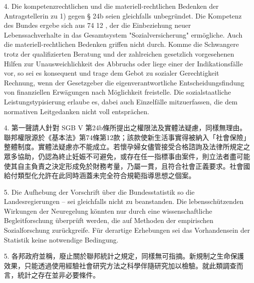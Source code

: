 \documentclass[12pt]{article}
\begin{document}
\begin{sourcepara}[title={原文C.29}]
4. Die kompetenzrechtlichen und die materiell-rechtlichen Bedenken der Antragstellerin zu 1) gegen § 24b \abbrSGBV{} seien gleichfalls unbegründet. Die Kompetenz des Bundes ergebe sich aus \abbrArt{} 74 \abbrNr{} 12 \abbrGG{}\ggfnArtSeventyFourTwelveDE{}, der die Einbeziehung neuer Lebenssachverhalte in das Gesamtsystem "Sozialversicherung" ermögliche. Auch die materiell-rechtlichen Bedenken griffen nicht durch. Komme die Schwangere trotz der qualifizierten Beratung und der zahlreichen gesetzlich vorgesehenen Hilfen zur Unausweichlichkeit des Abbruchs oder liege einer der Indikationsfälle vor, so sei es konsequent und trage dem Gebot zu sozialer Gerechtigkeit Rechnung, wenn der Gesetzgeber die eigenverantwortliche Entscheidungsfindung von finanziellen Erwägungen nach Möglichkeit freistelle. Die sozialstaatliche Leistungstypisierung erlaube es, dabei auch Einzelfälle mitzuerfassen, die dem normativen Leitgedanken nicht voll entsprächen.
\end{sourcepara}
\begin{transpara}
4. 第一聲請人針對 SGB V 第24b條所提出之權限法及實體法疑慮，同樣無理由。聯邦權限源於《基本法》第74條第12款\ggfnArtSeventyFourTwelveZH{}；該款使新生活事實得被納入「社會保險」整體制度。實體法疑慮亦不能成立。若懷孕婦女儘管接受合格諮詢及法律所規定之眾多協助，仍認為終止妊娠不可避免，或存在任一指標事由案件，則立法者盡可能使其自主負責之決定形成免於財務考量，乃屬一貫，且符合社會正義要求。社會國給付類型化允許在此同時涵蓋未完全符合規範指導思想之個案。
\end{transpara}

\begin{sourcepara}[title={原文C.30}]
5. Die Aufhebung der Vorschrift über die Bundesstatistik so die Landesregierungen -- sei gleichfalls nicht zu beanstanden. Die lebensschützenden Wirkungen der Neuregelung könnten nur durch eine wissenschaftliche Begleitforschung überprüft werden, die auf Methoden der empirischen Sozialforschung zurückgreife. Für derartige Erhebungen sei das Vorhandensein der Statistik keine notwendige Bedingung.
\end{sourcepara}
\begin{transpara}
5. 各邦政府並稱，廢止關於聯邦統計之規定，同樣無可指摘。新規制之生命保護效果，只能透過使用經驗社會研究方法之科學伴隨研究加以檢驗。就此類調查而言，統計之存在並非必要條件。
\end{transpara}

\end{document}
